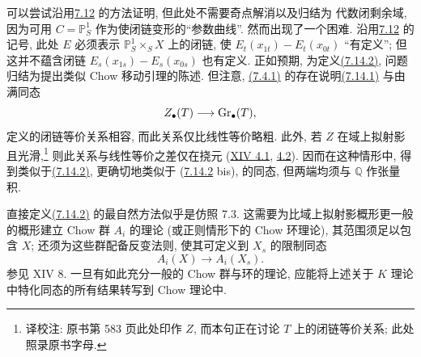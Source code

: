 可以尝试沿用\hyperlink{sga6.e10.para.7-12}{7.12} 的方法证明, 但此处不需要奇点解消以及归结为
%
代数闭剩余域, 因为可用 $C=\mathbb P^1_S$ 作为使闭链变形的“参数曲线”. 然而出现了一个困难. 沿用\hyperlink{sga6.e10.para.7-12}{7.12} 的记号, 此处 $E$ 必须表示 $\mathbb P^1_S\times_SX$ 上的闭链, 使 $E_t(x_{1t})-E_t(x_{0t})$ “有定义”; 但这并不蕴含闭链 $E_s(x_{1s})-E_s(x_{0s})$ 也有定义. 正如预期, 为定义\hyperlink{sga6.e10.eq.7-14-2}{(7.14.2)}, 问题归结为提出类似 Chow 移动引理的陈述. 但注意, \hyperlink{sga6.e10.eq.7-4-1}{(7.4.1)} 的存在说明\hyperlink{sga6.e10.eq.7-14-1}{(7.14.1)} 与由满同态
%
%
%
%
%
%
%
%
%
%
%
\[
Z_\bullet(T)\longrightarrow\operatorname{Gr}_\bullet(T),
\]
定义的闭链等价关系相容, 而此关系仅比线性等价略粗. 此外, 若 $Z$ 在域上拟射影且光滑,\footnote{译校注: 原书第 583 页此处印作 $Z$, 而本句正在讨论 $T$ 上的闭链等价关系; 此处照录原书字母.} 则此关系与线性等价之差仅在挠元 (\hyperlink{sga6.e14.para.4-1}{XIV 4.1}, \hyperlink{sga6.e14.para.4-2}{4.2}). 因而在这种情形中, 得到类似于\hyperlink{sga6.e10.eq.7-14-2}{(7.14.2)}, 更确切地类似于 (\hyperlink{sga6.e10.eq.7-14-2}{7.14.2} bis), 的同态, 但两端均须与 $\mathbb Q$ 作张量积.
%
%
%
%

直接定义\hyperlink{sga6.e10.eq.7-14-2}{(7.14.2)} 的最自然方法似乎是仿照 7.3. 这需要为比域上拟射影概形更一般的概形建立 Chow 群 $A_i$ 的理论 (或正则情形下的 Chow 环理论), 其范围须足以包含 $X$; 还须为这些群配备反变法则, 使其可定义到 $X_s$ 的限制同态
%
%
%
%
%
\[
A_i(X)\longrightarrow A_i(X_s).
\]
参见 XIV 8. 一旦有如此充分一般的 Chow 群与环的理论, 应能将上述关于 $K$ 理论中特化同态的所有结果转写到 Chow 理论中.
%
%

